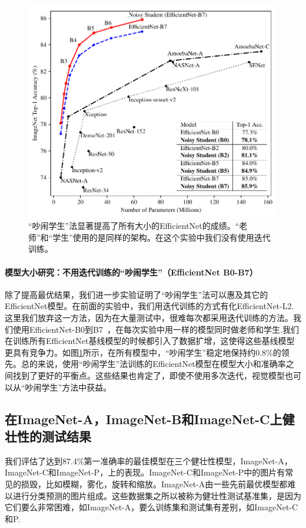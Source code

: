 \documentclass[10pt]{article}
\begin{document}
\begin{figure}[h!]
	\centering
	\includegraphics[width=\columnwidth]{fig/plot_vary_model_size.pdf}
	\caption{“吵闹学生”法显著提高了所有大小的EfficientNet的成绩。“老师”和“学生”使用的是同样的架构。在这个实验中我们没有使用迭代训练。}
	\label{fig:vary_model_size}
\end{figure}

\paragraph{模型大小研究：不用迭代训练的“吵闹学生”（EfficientNet B0-B7）}
除了提高最优结果，我们进一步实验证明了“吵闹学生”法可以惠及其它的EfficientNet模型。在前面的实验中，我们用迭代训练的方式有化EfficientNet-L2.这里我们放弃这一方法，因为在大量测试中，很难每次都采用迭代训练的方法。我们使用EfficientNet-B0到B7~\cite{tan2019efficientnet}，在每次实验中用一样的模型同时做老师和学生.我们在训练所有EfficientNet基线模型的时候都引入了数据扩增，这使得这些基线模型更具有竞争力。如图\ref{fig:vary_model_size}所示，在所有模型中，“吵闹学生”稳定地保持约0.8\%的领先。总的来说，使用“吵闹学生”法训练的EfficientNet模型在模型大小和准确率之间找到了更好的平衡点。这些结果也肯定了，即使不使用多次迭代，视觉模型也可以从“吵闹学生”方法中获益。

\subsection{在ImageNet-A，ImageNet-B和ImageNet-C上健壮性的测试结果}
我们评估了达到87.4\%第一准确率的最佳模型在三个健壮性模型，ImageNet-A，ImageNet-C和ImageNet-P，上的表现。ImageNet-C和ImageNet-P中的图片有常见的损毁，比如模糊，雾化，旋转和缩放。ImageNet-A由一些先前最优模型都难以进行分类预测的图片组成。这些数据集之所以被称为健壮性测试基准集，是因为它们要么非常困难，如ImageNet-A，要么训练集和测试集有差别，如ImageNet-C和P.  
\end{document}
